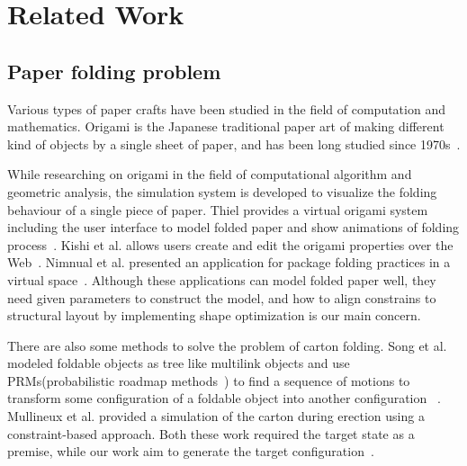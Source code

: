 \section{Related Work}\label{sec:relatedwork}
\subsection{Paper folding problem}
Various types of paper crafts have been studied in the field of computation and mathematics. Origami is the Japanese traditional paper art of making different kind of objects by a single sheet of paper, and has been long studied since 1970s~\cite{KANADE1980279}.

While researching on origami in the field of computational algorithm and geometric analysis, the simulation system is developed to visualize the folding behaviour of a single piece of paper. Thiel provides a virtual origami system including the user interface to model folded paper and show animations of folding process~\cite{Thiel1998}. Kishi et al. allows users create and edit the origami properties over the Web~\cite{Kishi:1998:OFP:786112.786279}. Nimnual et al. presented an application for package folding practices in a virtual space~\cite{Nimnual2007Virtual}. Although these applications can model folded paper well, they need given parameters to construct the model, and how to align constrains to structural layout by implementing shape optimization is our main concern.

There are also some methods to solve the problem of carton folding. Song et al. modeled foldable objects as tree like multilink objects and use PRMs(probabilistic roadmap methods~\cite{Kavraki:1994:PRP:891758}) to find a sequence of motions to transform some configuration of a foldable object into another configuration~ \cite{Song:2000:MPA:892954}. Mullineux et al. provided a simulation of the carton during erection using a constraint-based approach. Both these work required the target state as a premise, while our work aim to generate the target configuration~\cite{Mullineux:2010:CSC:1739328.1739673}.

